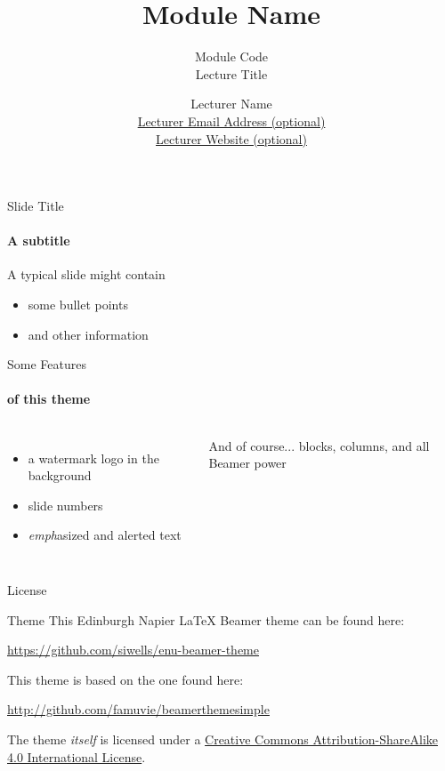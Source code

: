 \documentclass{beamer}
\title{Module Name}
\subtitle{Module Code\\Lecture Title}
\date{}%
\author{Lecturer Name\\
    \href{mailto:s.wells@napier.ac.uk}{Lecturer Email Address (optional)}\\
    \url{Lecturer Website (optional)}}
\institute{\url{Module Website Address (optional)}}
\begin{document}
\maketitle


\begin{frame}{Slide Title}
  \framesubtitle{A subtitle}

  A typical slide might contain

  \begin{itemize}
    \item some bullet points
    \item and other information
  \end{itemize}

  
\end{frame}

\begin{frame}{Some Features}
  \framesubtitle{of this theme}

  \begin{columns}
      \begin{itemize}
        \item a \alert{watermark} logo in the background
        \item slide \alert{numbers}
        \item \emph{emph}asized and \alert{alert}ed text
      \end{itemize}

      \begin{block}{And of course...}
         blocks, columns, and all Beamer power
      \end{block}
  \end{columns}
  
\end{frame}


\begin{frame}{License}

  \begin{block}{Theme}
    This Edinburgh Napier LaTeX Beamer theme can be found here:
    \begin{center}\url{https://github.com/siwells/enu-beamer-theme}\end{center}
    This theme is based on the one found here:
    \begin{center}\url{http://github.com/famuvie/beamerthemesimple}\end{center}
  \end{block}
  
  The theme \emph{itself} is licensed under a
  \href{http://creativecommons.org/licenses/by-sa/4.0/}{Creative Commons
  Attribution-ShareAlike 4.0 International License}.

  \begin{center}\ccbysa\end{center}

\end{frame}
\end{document}
